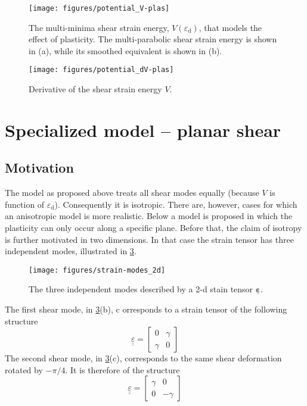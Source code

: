 \documentclass[namecite, fleqn]{goose-article}
\newcommand\T[1]{\underline{\bm{{#1}}}}
\begin{document}
\begin{figure}[htp]
    \centering
    \texttt{[image: figures/potential\_V-plas]}
    \caption{
        The multi-minima shear strain energy, $V ( \varepsilon_\mathrm{d} )$,
        that models the effect of plasticity.
    The multi-parabolic shear strain energy is shown in (a),
    while its smoothed equivalent is shown in (b).}
    \label{fig:V:plas}
\end{figure}

\begin{figure}[htp]
    \centering
    \texttt{[image: figures/potential\_dV-plas]}
    \caption{Derivative of the shear strain energy $V$.}
    \label{fig:dV:plas}
\end{figure}

\section{Specialized model -- planar shear}

\subsection{Motivation}

The model as proposed above treats all shear modes equally
(because $V$ is function of $\varepsilon_\mathrm{d}$).
Consequently it is isotropic.
There are, however, cases for which an anisotropic model is more realistic.
Below a model is proposed in which the plasticity can only occur along a specific plane.
Before that, the claim of isotropy is further motivated in two dimensions.
In that case the strain tensor has three independent modes,
illustrated in \cref{fig:strain-modes:2d}.

\begin{figure}[htp]
    \centering
    \texttt{[image: figures/strain-modes\_2d]}
    \caption{The three independent modes described by a 2-d stain tensor $\T{\varepsilon}$.}
    \label{fig:strain-modes:2d}
\end{figure}

The first shear mode, in \cref{fig:strain-modes:2d}(b), c
orresponds to a strain tensor of the following structure
\begin{equation}
    \label{eq:strain-modes:basic}
    \underline{\underline{\varepsilon}}
    =
    \begin{bmatrix}
        0 & \gamma \\
        \gamma & 0
    \end{bmatrix}
\end{equation}
The second shear mode, in \cref{fig:strain-modes:2d}(c),
corresponds to the same shear deformation rotated by $-\pi/4$.
It is therefore of the structure
\begin{equation}
    \underline{\underline{\varepsilon}}
    =
    \begin{bmatrix}
        \gamma & 0 \\
         0 & -\gamma
    \end{bmatrix}
\end{equation}
\end{document}
